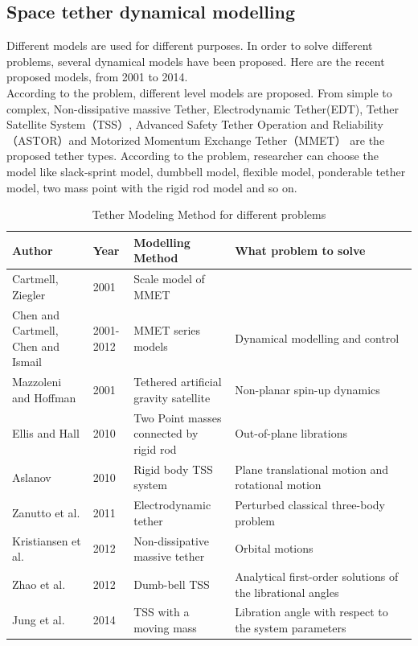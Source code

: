 \subsection{Space tether dynamical modelling}

Different models are used for different purposes. In order to solve different problems, several dynamical models have been proposed. Here are the recent proposed models, from 2001 to 2014.\\

According to the problem, different level models are proposed. From simple to complex, Non-dissipative massive Tether, Electrodynamic Tether(EDT), Tether Satellite System（TSS）, Advanced Safety Tether Operation and Reliability（ASTOR）and Motorized Momentum Exchange Tether（MMET） are the proposed tether types. According to the problem, researcher can choose the model like slack-sprint model, dumbbell model, flexible model, ponderable tether model, two mass point with the rigid rod model and so on.



\begin{figure}[ht]
\end{figure}

\begin{table}[h!]
\renewcommand\arraystretch{2}
	\begin{center}
	\caption{Tether Modeling Method for different problems}
	\begin{tabular}{p{0.2\linewidth}|p{0.1\linewidth}|p{0.25\linewidth}|p{0.45\linewidth}}
	\toprule
	\textbf{Author} & \textbf{Year} & \textbf{Modelling Method} & \textbf{What problem to solve}\\
	\midrule
	Cartmell, Ziegler & 2001 & Scale model of MMET & \\
	Chen and Cartmell, Chen and Ismail & 2001-2012 & MMET series models & Dynamical modelling and control\\
	Mazzoleni and Hoffman & 2001 & Tethered artificial gravity satellite & Non-planar spin-up dynamics\\
	Ellis and Hall&	2010&	Two Point masses connected by rigid rod & Out-of-plane librations\\
	Aslanov &	2010&	Rigid body TSS system	& Plane translational motion and rotational motion\\
	Zanutto et al.& 2011 & Electrodynamic tether & Perturbed classical three-body problem\\
	Kristiansen et al.&	2012 &	Non-dissipative massive tether & Orbital motions\\
	Zhao et al.	&2012&	Dumb-bell TSS & Analytical first-order solutions of the librational angles\\
	Jung et al. & 2014 &	TSS with a moving mass & Libration angle with respect to the system parameters\\
	\bottomrule
	\end{tabular}	
	\end{center}
\end{table}



\newpage
